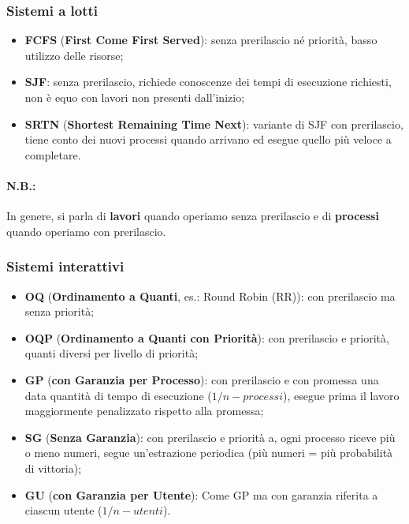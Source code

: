 \documentclass{article}
\begin{document}
\subsubsection{Sistemi a lotti} \begin{itemize}
    \item \textbf{FCFS} (\textbf{First Come First Served}): senza prerilascio né priorità, basso utilizzo delle risorse;
    \item \textbf{SJF}: senza prerilascio, richiede conoscenze dei tempi di esecuzione richiesti, non è equo con lavori non presenti dall'inizio;
    \item \textbf{SRTN} (\textbf{Shortest Remaining Time Next}): variante di SJF con prerilascio, tiene conto dei nuovi processi quando arrivano ed esegue quello più veloce a completare.
\end{itemize}

\paragraph{N.B.:} In genere, si parla di \textbf{lavori} quando operiamo senza prerilascio e di \textbf{processi} quando operiamo con prerilascio.

\subsubsection{Sistemi interattivi} \begin{itemize}
    \item \textbf{OQ} (\textbf{Ordinamento a Quanti}, es.: Round Robin (RR)): con prerilascio ma senza priorità;
    \item \textbf{OQP} (\textbf{Ordinamento a Quanti con Priorità}): con prerilascio e priorità, quanti diversi per livello di priorità;
    \item \textbf{GP} (\textbf{con Garanzia per Processo}): con prerilascio e con promessa una data quantità di tempo di esecuzione ($1/n-processi$), esegue prima il lavoro maggiormente penalizzato rispetto alla promessa;
    \item \textbf{SG} (\textbf{Senza Garanzia}): con prerilascio e priorità a, ogni processo riceve più o meno numeri, segue un'estrazione periodica (più numeri = più probabilità di vittoria);
    \item \textbf{GU} (\textbf{con Garanzia per Utente}): Come GP ma con garanzia riferita a ciascun utente ($1/n-utenti$).
\end{itemize}
\end{document}

